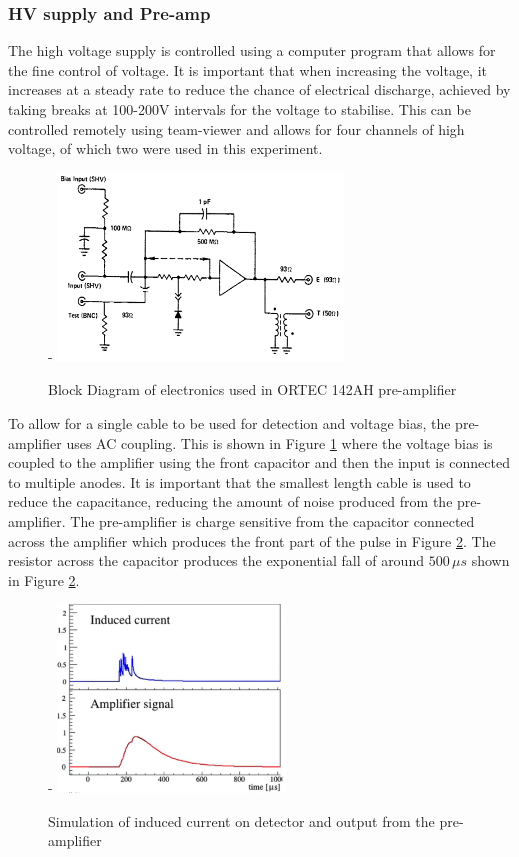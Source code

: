 \documentclass[a4paper]{article}
\begin{document}
\subsubsection{HV supply and Pre-amp}
The high voltage supply is controlled using a computer program that allows for the fine control of voltage. It is important that when increasing the voltage, it increases at a steady rate to reduce the chance of electrical discharge, achieved by taking breaks at 100-200V intervals for the voltage to stabilise. This can be controlled remotely using team-viewer and allows for four channels of high voltage, of which two were used in this experiment.
\begin{figure}[H]-
    \centering
    \includegraphics[height=5cm]{amp.png}
    \caption{Block Diagram of electronics used in ORTEC 142AH pre-amplifier \cite{ortec}}
    \label{fig:amp}
\end{figure}
\noindent To allow for a single cable to be used for detection and voltage bias, the pre-amplifier uses AC coupling. This is shown in Figure \ref{fig:amp} where the voltage bias is coupled to the amplifier using the front capacitor and then the input is connected to multiple anodes. It is important that the smallest length cable is used to reduce the capacitance, reducing the amount of noise produced from the pre-amplifier. The pre-amplifier is charge sensitive from the capacitor connected across the amplifier which produces the front part of the pulse in Figure \ref{fig:amplifier}. The resistor across the capacitor produces the exponential fall of around $500\,\mu s$ \cite{ortec_web} shown in Figure \ref{fig:amplifier}. 
\begin{figure}[H]-
    \centering
    \includegraphics[height=5cm]{amplifier.png}
    \caption{Simulation of induced current on detector and output from the pre-amplifier \cite{news_2020}}
    \label{fig:amplifier}
\end{figure}
\end{document}
